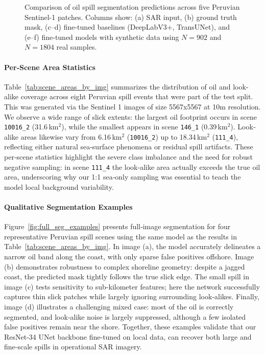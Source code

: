 \documentclass[12pt]{article}
\begin{document}
\begin{figure}[htbp]
{\begin{tabular}{cccccc}
  \end{tabular}}
  \caption{Comparison of oil spill segmentation predictions across five Peruvian Sentinel-1 patches. Columns show: (a) SAR input, (b) ground truth mask, (c–d) fine-tuned baselines (DeepLabV3+, TransUNet), and (e–f) fine-tuned models with synthetic data using $N{=}902$ and $N{=}1804$ real samples.}
  \label{fig:patch_comparison_updated}
\end{figure}



\paragraph{Per‐Scene Area Statistics}  
Table~\ref{tab:scene_areas_by_img} summarizes the distribution of oil and look‐alike coverage across eight Peruvian spill events that were part of the test split. This was generated via the Sentinel 1 images of size 5567x5567 at 10m resolution.  We observe a wide range of slick extents: the largest oil footprint occurs in scene \texttt{10016\_2} (31.6\,km\(^2\)), while the smallest appears in scene \texttt{146\_1} (0.39\,km\(^2\)). Look‐alike areas likewise vary from 6.16\,km\(^2\) (\texttt{10016\_2}) up to 18.34\,km\(^2\) (\texttt{111\_4}), reflecting either natural sea‐surface phenomena or residual spill artifacts. These per‐scene statistics highlight the severe class imbalance and the need for robust negative sampling: in scene \texttt{111\_4} the look‐alike area actually exceeds the true oil area, underscoring why our 1:1 sea‐only sampling was essential to teach the model local background variability.


\paragraph{Qualitative Segmentation Examples}  
Figure~\ref{fig:full_seg_examples} presents full‐image segmentation for four representative Peruvian spill scenes using the same model as the results in Table~\ref{tab:scene_areas_by_img}. In image (a), the model accurately delineates a narrow oil band along the coast, with only sparse false positives offshore. Image (b) demonstrates robustness to complex shoreline geometry: despite a jagged coast, the predicted mask tightly follows the true slick edge. The small spill in image (c)  tests sensitivity to sub-kilometer features; here the network successfully captures thin slick patches while largely ignoring surrounding look‐alikes. Finally, image (d) illustrates a challenging mixed case: most of the oil is correctly segmented, and look‐alike noise is largely suppressed, although a few isolated false positives remain near the shore. Together, these examples validate that our ResNet-34 UNet backbone fine-tuned on local data, can recover both large and fine-scale spills in operational SAR imagery.
\end{document}
